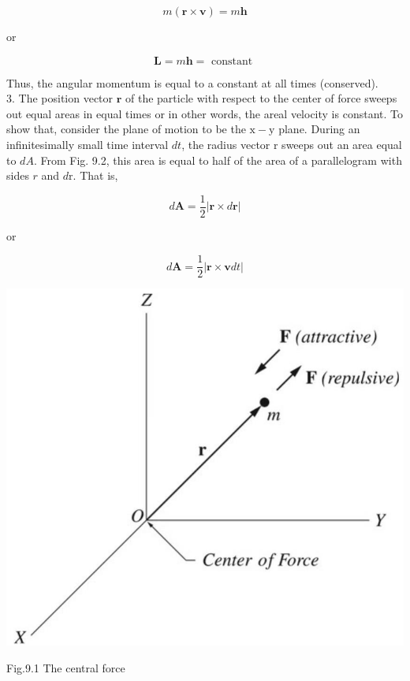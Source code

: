 \documentclass[10pt]{article}
\begin{document}
$$
m(\mathbf{r} \times \mathbf{v})=m \mathbf{h}
$$

or

$$
\mathbf{L}=m \mathbf{h}=\text { constant }
$$

Thus, the angular momentum is equal to a constant at all times (conserved).\\
3. The position vector $\mathbf{r}$ of the particle with respect to the center of force sweeps out equal areas in equal times or in other words, the areal velocity is constant. To show that, consider the plane of motion to be the $\mathrm{x}-\mathrm{y}$ plane. During an infinitesimally small time interval $d t$, the radius vector r sweeps out an area equal to $d A$. From Fig. 9.2, this area is equal to half of the area of a parallelogram with sides $r$ and $d \mathrm{r}$. That is,

$$
d \mathbf{A}=\frac{1}{2}|\mathbf{r} \times d \mathbf{r}|
$$

or

$$
d \mathbf{A}=\frac{1}{2}|\mathbf{r} \times \mathbf{v} d t|
$$

\begin{center}
\includegraphics[max width=\textwidth]{2024_09_13_db1f357d2aad0a03eb2eg-143}
\end{center}

Fig.9.1 The central force
\end{document}
